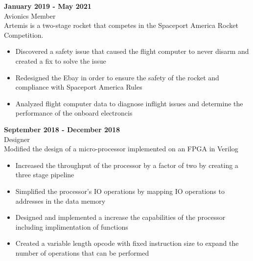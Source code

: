 \documentclass[10pt]{article}
\newcommand{\entrySpacing}{4pt}
\begin{document}
\noindent\begin{minipage}{\linewidth}
 \hfill \textbf{January 2019 - May 2021}\\
Avionics Member\hfill \\Artemis is a two-stage rocket that competes in the Spaceport America Rocket Competition.
\begin{itemize}[noitemsep,nolistsep]
\item Discovered a safety issue that caused the flight computer to never disarm and created a fix to solve the issue
\item Redesigned the Ebay in order to ensure the safety of the rocket and compliance with Spaceport America Rules
\item Analyzed flight computer data to diagnose inflight issues and determine the performance of the onboard electroncis
\end{itemize}


\end{minipage}
\vspace{\entrySpacing}

\noindent\begin{minipage}{\linewidth}
 \hfill \textbf{September 2018 - December 2018}\\
Designer\hfill \\Modified the design of a micro-processor implemented on an FPGA in Verilog
\begin{itemize}[noitemsep,nolistsep]
\item Increased the throughput of the processor by a factor of two by creating a three stage pipeline
\item Simplified the processor’s IO operations by mapping IO operations to addresses in the data memory
\item Designed and implemented a increase the capabilities of the processor including implimentation of functions
\item Created a variable length opcode with fixed instruction size to expand the number of operations that can be performed
\end{itemize}


\end{minipage}
\vspace{\entrySpacing}
\end{document}
